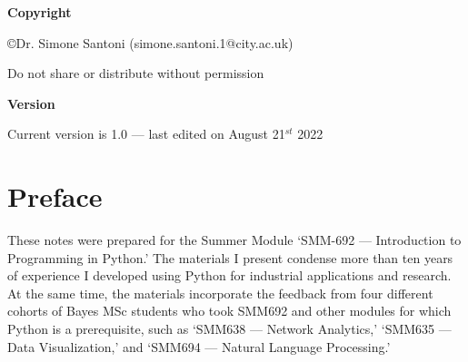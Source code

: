 \documentclass[a4paper,11pt]{book}
\begin{document}

\clearpage
\centering 


\vspace{6em}

\textbf{Copyright}

\copyright Dr. Simone Santoni (simone.santoni.1@city.ac.uk)

Do not share or distribute without permission

\vspace{3em}

\textbf{Version}

Current version is 1.0 --- last edited on August 21$^{st}$ 2022
\clearpage

\tableofcontents

\listoffigures

\listoftables

\clearpage

\mainmatter
\chapter*{Preface}

\raggedright These notes were prepared for the Summer Module `SMM-692 --- Introduction to Programming in Python.' The materials I present condense more than ten years of experience I developed using Python for industrial applications and research. At the same time, the materials incorporate the feedback from four different cohorts of Bayes MSc students who took SMM692 and other modules for which Python is a prerequisite, such as `SMM638 --- Network Analytics,' `SMM635 --- Data Visualization,' and `SMM694 --- Natural Language Processing.' 
\end{document}
